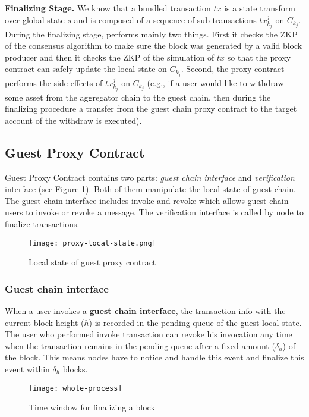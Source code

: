 \smallskip\noindent\textbf{Finalizing Stage.}
We know that a bundled transaction $tx$ is a state transform over global state $s$ and is composed of a sequence of sub-transactions $tx^j_{k_j}$ on $C_{k_j}$. During the finalizing stage, \dprotocol performs mainly two things. First it checks the ZKP of the consensus algorithm to make sure the block was generated by a valid block producer and then it checks the ZKP of the simulation of $tx$ so that the proxy contract can safely update the local state on $C_{k_j}$. Second, the proxy contract performs the side effects of $tx^j_{k_j}$ on $C_{k_j}$ (e.g., if a user would like to withdraw some asset from the aggregator chain to the guest chain, then during the finalizing procedure a transfer from the guest chain proxy contract to the target account of the withdraw is executed).

\subsection{Guest Proxy Contract}
Guest Proxy Contract contains two parts: \emph{guest chain interface} and \emph{verification} interface (see Figure \ref{local-state}). Both of them manipulate the local state of guest chain. The guest chain interface includes invoke and revoke which allows guest chain users to invoke or revoke a message. The verification interface is called by \dprotocol node to finalize transactions.

\begin{figure}[!ht]
\texttt{[image: proxy-local-state.png]}
\caption{Local state of guest proxy contract}
\label{local-state}
\end{figure}

\subsubsection*{Guest chain interface}
When a user invokes a {\bf guest chain interface}, the transaction info with the current block height ($h$) is recorded in the pending queue of the guest local state. The user who performed invoke transaction can revoke his invocation any time when the transaction remains in the pending queue after a fixed amount ($\delta_h$) of the block. This means \dprotocol nodes have to notice and handle this event and finalize this event within $\delta_h$ blocks.

\begin{figure}[!ht]
\texttt{[image: whole-process]}
\caption{Time window for finalizing a block}
\label{time-window-finalizing}
\end{figure}

